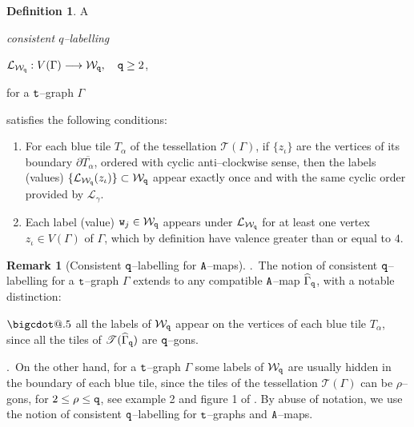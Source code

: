 \documentclass[final,3p,times]{elsarticle}
\makeatletter
\newcommand*\bigcdot{\mathpalette\bigcdot@{.5}}
\newcommand*\bigcdot@[2]{\mathbin{\vcenter{\hbox{\scalebox{#2}{$\m@th#1\bullet$}}}}}
\theoremstyle{definition}
\newtheorem{definition}[theorem]{Definition}
\newtheorem{remark}[theorem]{Remark}
\makeatother
\begin{document}
\begin{definition}
\label{def:etiquetado-consistente}
A {\it consistent $q$--labelling 

\centerline{$\mathcal{L}_{\mathcal{W}_{\tt q}}: V(\Gamma) \longrightarrow \mathcal{W}_{\tt q}, 
\ \ \
{\tt q} \geq 2$, } 

\noindent 
for a ${\tt t}$--graph $\Gamma$} satisfies the following conditions:

\begin{enumerate}[label=\roman*),leftmargin=*]
\item
For each blue tile $T_\alpha$ of the tessellation
$\mathscr{T}(\Gamma)$, 
if $\{ z_\iota \}$ are the vertices of its
boundary $\partial \overline{T_\alpha}$, ordered 
with cyclic anti--clockwise sense, then the 
labels (values) $\{ \mathcal{L}_{\mathcal{W}_{\tt q}} ( z_\iota ) \} \subset \mathcal{W}_{\tt q}$
appear exactly once and with the same cyclic 
order provided by $\mathcal{L}_\gamma$.

\item
Each label (value) ${\tt w}_{j} \in \mathcal{W}_{\tt q}$ appears under
$\mathcal{L}_{\mathcal{W}_{\tt q}}$ for at least one
vertex $z_\iota \in V(\Gamma)$ of
$\Gamma$, which by definition have
valence greater than or equal to $4$.
\end{enumerate}  
\end{definition}



\begin{remark}[Consistent $\tt q$--labelling for ${\tt A}$--maps]
\noindent 1.\ The notion of consistent $\tt q$--labelling for 
a ${\tt t}$--graph $\Gamma$ extends to any 
compatible ${\tt A}$--map
$\widehat{\Gamma}_{\tt q}$, with a notable distinction:

\noindent
$\bigcdot$ all the labels 
of $\mathcal{W}_{\tt q}$ appear on the vertices  
of each blue tile $T_\alpha$, since all the tiles of 
$\mathscr{T}(\widehat{\Gamma}_{\tt q})$ are $\tt q$--gons.

.\ On the other hand, for 
a $\tt t$--graph $\Gamma$ some labels
of $\mathcal{W}_{\tt q}$ are usually hidden  in the boundary
of each blue tile, since the tiles of the tessellation 
$\mathscr{T}(\Gamma)$ can be 
$\rho$--gons, for $2 \leq \rho \leq {\tt q} $,
see example 2 and figure 1 of \cite{AlvarezGutierrezMucino}.
By abuse of notation, we use the notion of consistent 
$\tt q$--labelling for ${\tt t}$--graphs and ${\tt A}$--maps.
\end{remark}
\end{document}
